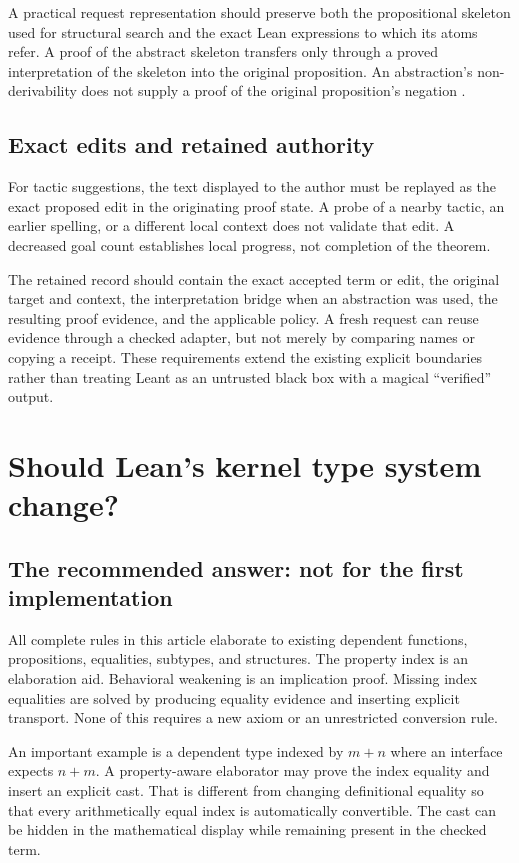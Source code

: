 \documentclass[11pt,a4paper]{article}
\theoremstyle{definition}
\theoremstyle{remark}
\begin{document}
A practical request representation should preserve both the propositional skeleton used for structural search and the exact Lean expressions to which its atoms refer. A proof of the abstract skeleton transfers only through a proved interpretation of the skeleton into the original proposition. An abstraction's non-derivability does not supply a proof of the original proposition's negation \cite{synA,synB}.

\subsection{Exact edits and retained authority}
For tactic suggestions, the text displayed to the author must be replayed as the exact proposed edit in the originating proof state. A probe of a nearby tactic, an earlier spelling, or a different local context does not validate that edit. A decreased goal count establishes local progress, not completion of the theorem.

The retained record should contain the exact accepted term or edit, the original target and context, the interpretation bridge when an abstraction was used, the resulting proof evidence, and the applicable policy. A fresh request can reuse evidence through a checked adapter, but not merely by comparing names or copying a receipt. These requirements extend the existing explicit boundaries rather than treating Leant as an untrusted black box with a magical ``verified'' output.

\section{Should Lean's kernel type system change?}
\label{sec:kernel}

\subsection{The recommended answer: not for the first implementation}
All complete rules in this article elaborate to existing dependent functions, propositions, equalities, subtypes, and structures. The property index is an elaboration aid. Behavioral weakening is an implication proof. Missing index equalities are solved by producing equality evidence and inserting explicit transport. None of this requires a new axiom or an unrestricted conversion rule.

An important example is a dependent type indexed by $m+n$ where an interface expects $n+m$. A property-aware elaborator may prove the index equality and insert an explicit cast. That is different from changing definitional equality so that every arithmetically equal index is automatically convertible. The cast can be hidden in the mathematical display while remaining present in the checked term.
\end{document}
